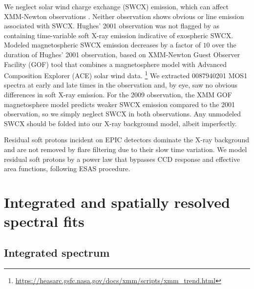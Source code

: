 \documentclass[preprint2,tighten,trackchanges]{aastex6}
\begin{document}
We neglect solar wind charge exchange (SWCX) emission, which can affect
XMM-Newton observations \citep{snowden2004, carter2011}.
Neither observation shows obvious  or  line emission associated with
SWCX.
Hughes' 2001 observation was not flagged by \citet{carter2011} as containing
time-variable soft X-ray emission indicative of exospheric SWCX.
Modeled magnetospheric SWCX emission decreases by a factor of $10$ over the
duration of Hughes' 2001 observation, based on XMM-Newton Guest Observer
Facility (GOF) tool that combines a magnetosphere model \citep{spreiter1966} with
Advanced Composition Explorer (ACE) solar wind data.
\footnote{\url{https://heasarc.gsfc.nasa.gov/docs/xmm/scripts/xmm_trend.html}}
We extracted 0087940201 MOS1 spectra at early and late times in the observation
and, by eye, saw no obvious differences in soft X-ray emission.
For the 2009 observation, the XMM GOF magnetosphere model predicts weaker SWCX
emission compared to the 2001 observation, so we simply neglect SWCX in both
observations.
Any unmodeled SWCX should be folded into our X-ray background model, albeit
imperfectly.

Residual soft protons incident on EPIC detectors dominate the X-ray background
and are not removed by flare filtering due to their slow time variation.
We model residual soft protons by a power law that bypasses CCD response and
effective area functions, following ESAS procedure.


\section{Integrated and spatially resolved spectral fits} \label{sec:spec}

\subsection{Integrated spectrum} \label{sec:src-bkg}
\end{document}
